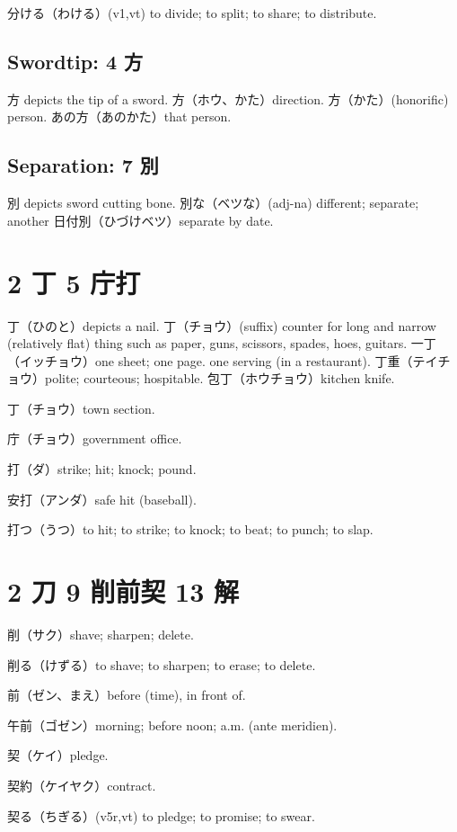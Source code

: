 分ける（わける）(v1,vt) to divide; to split; to share; to distribute.

\subsection{Swordtip: 4 方}

方 depicts the tip of a sword.
方（ホウ、かた）direction.
方（かた）(honorific) person.
あの方（あのかた）that person.

\subsection{Separation: 7 別}

別 depicts sword cutting bone.
別な（ベツな）(adj-na) different; separate; another
日付別（ひづけベツ）separate by date.

\section{2 丁 5 庁打}

丁（ひのと）depicts a nail.
丁（チョウ）(suffix)
counter for long and narrow (relatively flat) thing
such as paper, guns, scissors, spades, hoes, guitars.
一丁（イッチョウ）one sheet; one page.
one serving (in a restaurant).
丁重（テイチョウ）polite; courteous; hospitable.
包丁（ホウチョウ）kitchen knife.

丁（チョウ）town section.

庁（チョウ）government office.

打（ダ）strike; hit; knock; pound.

安打（アンダ）safe hit (baseball).

打つ（うつ）to hit; to strike; to knock; to beat; to punch; to slap.

\section{2 刀 9 削前契 13 解}

削（サク）shave; sharpen; delete.

削る（けずる）to shave; to sharpen; to erase; to delete.

前（ゼン、まえ）before (time), in front of.

午前（ゴゼン）morning; before noon; a.m. (ante meridien).

契（ケイ）pledge.

契約（ケイヤク）contract.

契る（ちぎる）(v5r,vt) to pledge; to promise; to swear.

